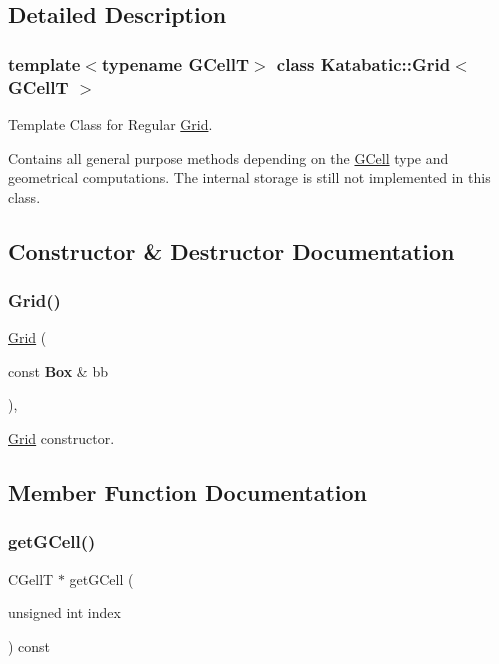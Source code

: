 \subsection{Detailed Description}
\subsubsection*{template$<$typename G\+CellT$>$\newline
class Katabatic\+::\+Grid$<$ G\+Cell\+T $>$}

Template Class for Regular \hyperlink{classKatabatic_1_1Grid}{Grid}. 

Contains all general purpose methods depending on the \hyperlink{classKatabatic_1_1GCell}{G\+Cell} type and geometrical computations. The internal storage is still not implemented in this class. 

\subsection{Constructor \& Destructor Documentation}
\mbox{\label{classKatabatic_1_1Grid_a1b772cc784f7110caca47acb76dcec62}} 
\subsubsection{\texorpdfstring{Grid()}{Grid()}}
{\footnotesize\ttfamily \hyperlink{classKatabatic_1_1Grid}{Grid} (\begin{DoxyParamCaption}\item[{const \textbf{ Box} \&}]{bb }\end{DoxyParamCaption})\hspace{0.3cm}{\ttfamily [inline]}, {\ttfamily [protected]}}

\hyperlink{classKatabatic_1_1Grid}{Grid} constructor. 

\subsection{Member Function Documentation}
\mbox{\label{classKatabatic_1_1Grid_a98650c11b4aa0c6107c4d890dff61587}} 
\subsubsection{\texorpdfstring{get\+G\+Cell()}{getGCell()}\hspace{0.1cm}{\footnotesize\ttfamily [1/3]}}
{\footnotesize\ttfamily C\+GellT $\ast$ get\+G\+Cell (\begin{DoxyParamCaption}\item[{unsigned int}]{index }\end{DoxyParamCaption}) const\hspace{0.3cm}{\ttfamily [inline]}}

